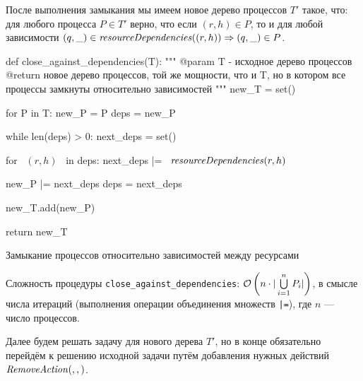 После выполнения замыкания мы имеем новое дерево процессов $T'$ такое, что: для любого процесса $P \in T'$ верно, что если $(r, h) \in P$, то и для любой зависимости $(q, \_) \in \text{\textit{resourceDependencies}}((r, h)) \Rightarrow (q, \_) \in P$.

\begin{listing}[ht!]
\begin{pythoncode}
def close_against_dependencies(T):
    """
    @param T - исходное дерево процессов
    @return новое дерево процессов, той же мощности, что и T, но в котором все процессы 
            замкнуты относительно зависимостей
    """
    new_T = set()

    for P in T:
        new_P = P
        deps = new_P

        while len(deps) > 0:
            next_deps = set()

            for ~$(r, h)$~ in deps:
                next_deps |= ~$\crdependenices{r, h}$~

            new_P |= next_deps
            deps = next_deps

        new_T.add(new_P)

    return new_T
\end{pythoncode}
\caption{Замыкание процессов относительно зависимостей между ресурсами}
\label{code:closedeps}
\end{listing}

Сложность процедуры \texttt{close\_against\_dependencies}: $\mathcal{O}\left(n\cdot|\bigcup\limits_{i = 1}^{n}{P_i}|\right)$, в смысле числа итераций (выполнения операции объединения множеств \texttt{|=}), где $n$ --- число процессов.

Далее будем решать задачу для нового дерева $T'$, но в конце обязательно перейдём к решению исходной задачи путём добавления нужных действий $\text{\textit{RemoveAction}}(, , )$.

